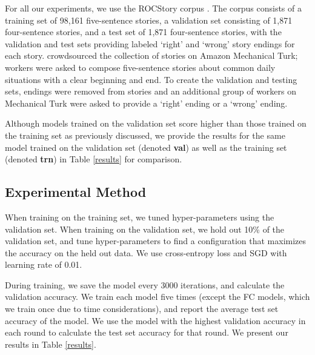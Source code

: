 \documentclass[11pt,a4paper]{article}
\begin{document}
For all our experiments, we use the ROCStory corpus \cite{mostafazadeh2016corpus}. 
The corpus consists of a training set of 98,161 five-sentence stories, a validation set consisting of 1,871 four-sentence stories, and a test set of 1,871 four-sentence stories, with the validation and test sets providing labeled `right' and `wrong' story endings for each story.
\cite{mostafazadeh2016corpus} crowdsourced the collection of stories on Amazon Mechanical Turk; workers were asked to compose five-sentence stories about common daily situations with a clear beginning and end. 
To create the validation and testing sets, endings were removed from stories and an additional group of workers on Mechanical Turk were asked to provide a `right' ending or a `wrong' ending.

Although models trained on the validation set score higher than those trained on the training set as previously discussed, we provide the results for the same model trained on the validation set (denoted {\bf val}) as well as the training set (denoted {\bf trn}) in Table \ref{results} for comparison.


\subsection{Experimental Method}

When training on the training set, we tuned hyper-parameters using the validation set. When training on the validation set, we hold out 10\% of the validation set, and tune hyper-parameters to find a configuration that maximizes the accuracy on the held out data. We use cross-entropy loss and SGD with learning rate of 0.01. 

During training, we save the model every 3000 iterations, and calculate the validation accuracy. We train each model five times (except the FC models, which we train once due to time considerations), and report the average test set accuracy of the model. We use the model with the highest validation accuracy in each round to calculate the test set accuracy for that round. We present our results in Table \ref{results}.
\end{document}
